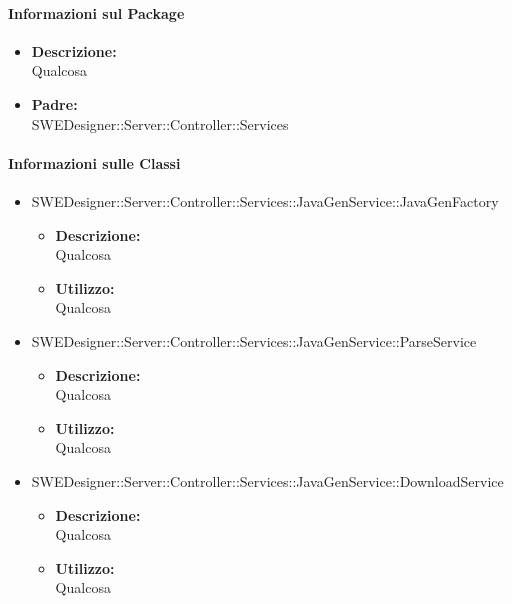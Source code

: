 		\paragraph{Informazioni sul Package}
		\begin{itemize}				
			\item \textbf{Descrizione: }\\
			Qualcosa
			\item \textbf{Padre: }\\ SWEDesigner::Server::Controller::Services
			
		\end{itemize}
		\paragraph{Informazioni sulle Classi}
		\begin{itemize}
			\item SWEDesigner::Server::Controller::Services::JavaGenService::JavaGenFactory
			\begin{itemize}
				\item \textbf{Descrizione: }\\
				Qualcosa
				\item \textbf{Utilizzo: }\\
				Qualcosa
			\end{itemize}
			\item SWEDesigner::Server::Controller::Services::JavaGenService::ParseService
			\begin{itemize}
				\item \textbf{Descrizione: }\\
				Qualcosa
				\item \textbf{Utilizzo: }\\
				Qualcosa
			\end{itemize}
			\item SWEDesigner::Server::Controller::Services::JavaGenService::DownloadService
			\begin{itemize}
				\item \textbf{Descrizione: }\\
				Qualcosa
				\item \textbf{Utilizzo: }\\
				Qualcosa
			\end{itemize}
		\end{itemize}
		
